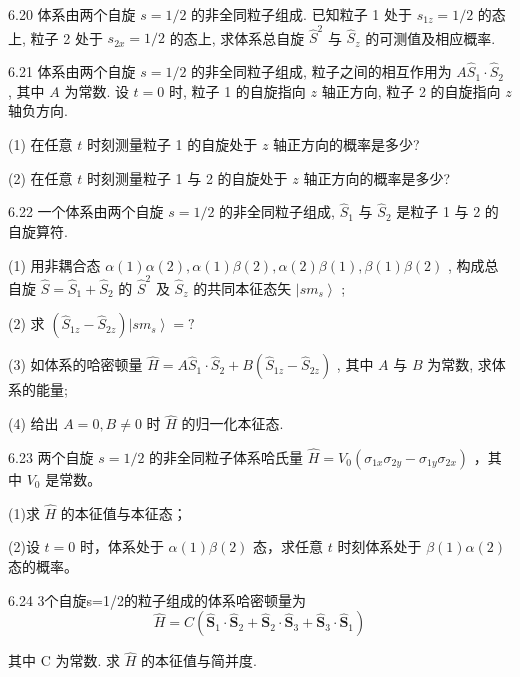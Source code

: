 \vfill\newpage

6.20 体系由两个自旋 $s = 1 / 2$ 的非全同粒子组成. 已知粒子 1 处于 $s_{1z} = 1 / 2$ 的态上, 粒子 2 处于 $s_{2x} = 1 / 2$ 的态上, 求体系总自旋 $\hat{S}^2$ 与 $\hat{S}_z$ 的可测值及相应概率.

\vfill\newpage

6.21 体系由两个自旋 $s = 1 / 2$ 的非全同粒子组成, 粒子之间的相互作用为 $A\hat{S}_1 \cdot \hat{S}_2$ , 其中 $A$ 为常数. 设 $t = 0$ 时, 粒子 1 的自旋指向 $z$ 轴正方向, 粒子 2 的自旋指向 $z$ 轴负方向. 

(1) 在任意 $t$ 时刻测量粒子 1 的自旋处于 $z$ 轴正方向的概率是多少? 

(2) 在任意 $t$ 时刻测量粒子 1 与 2 的自旋处于 $z$ 轴正方向的概率是多少?

\vfill\newpage

6.22 一个体系由两个自旋 $s = 1 / 2$ 的非全同粒子组成, $\hat{S}_1$ 与 $\hat{S}_2$ 是粒子 1 与 2 的自旋算符.

(1) 用非耦合态 $\alpha(1)\alpha(2),\alpha(1)\beta(2),\alpha(2)\beta(1),\beta(1)\beta(2)$ , 构成总自旋 $\hat{S} = \hat{S}_1 + \hat{S}_2$ 的 $\hat{S}^2$ 及 $\hat{S}_z$ 的共同本征态矢 $\left|sm_s\right\rangle$ ; 

(2) 求 $(\hat{S}_{1z} - \hat{S}_{2z})\left|sm_s\right\rangle = ?$ 

(3) 如体系的哈密顿量 $\hat{H} = A\hat{S}_1\cdot \hat{S}_2 + B(\hat{S}_{1z} - \hat{S}_{2z})$ , 其中 $A$ 与 $B$ 为常数, 求体系的能量; 

(4) 给出 $A = 0, B \neq 0$ 时 $\hat{H}$ 的归一化本征态.

\vfill\newpage

6.23 两个自旋 $s = 1 / 2$ 的非全同粒子体系哈氏量 $\hat{H} = V_0(\sigma_{1x}\sigma_{2y} - \sigma_{1y}\sigma_{2x})$ ，其中 $V_0$ 是常数。

(1)求 $\hat{H}$ 的本征值与本征态；

(2)设 $t = 0$ 时，体系处于 $\alpha(1)\beta(2)$ 态，求任意 $t$ 时刻体系处于 $\beta(1)\alpha(2)$ 态的概率。

\vfill\newpage

6.24 3个自旋s=1/2的粒子组成的体系哈密顿量为
$$
\hat {H} = C \left(\hat {\boldsymbol {S}} _ {1} \cdot \hat {\boldsymbol {S}} _ {2} + \hat {\boldsymbol {S}} _ {2} \cdot \hat {\boldsymbol {S}} _ {3} + \hat {\boldsymbol {S}} _ {3} \cdot \hat {\boldsymbol {S}} _ {1}\right)
$$

其中 C 为常数. 求 $\hat{H}$ 的本征值与简并度.

\vfill\newpage

